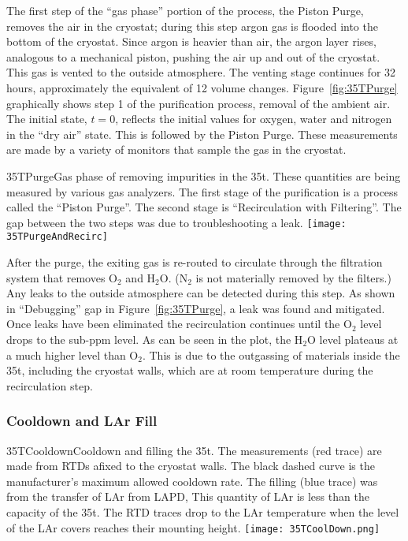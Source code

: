 The first step of the ``gas phase'' portion of the process, the Piston Purge, removes the air in the cryostat; during this step argon gas is flooded into the bottom of the cryostat. Since argon is heavier than air, the argon layer rises, analogous to a mechanical piston, pushing the air up and out of the cryostat. This gas  is vented to the outside atmosphere. The venting stage continues for 32 hours, approximately the equivalent of 12 volume changes. 
%
Figure~\ref{fig:35TPurge} graphically shows step 1 of the purification process, removal of the ambient air. The initial state, $t=0$, reflects the initial values for oxygen, water and nitrogen in the ``dry air'' state. This is followed by the Piston Purge.
These measurements are made by a variety of %
monitors that sample the gas in the cryostat. 

\begin{cdrfigure}{35TPurge}{Gas phase of removing impurities in the 35t. These quantities are being measured by various gas analyzers. The first stage of the purification is a process called the ``Piston Purge''.  The second stage is ``Recirculation with Filtering''. The gap between the two steps was due to troubleshooting a leak.}
  \texttt{[image: 35TPurgeAndRecirc]}
\end{cdrfigure}


After the purge, the exiting gas  is re-routed to circulate through the filtration system that removes O$_2$ and H$_2$O. (N$_2$ is not materially removed by the filters.) Any leaks to the outside atmosphere can be detected during this step. As shown in ``Debugging'' gap in Figure~\ref{fig:35TPurge}, a leak was found and mitigated. Once leaks have been eliminated the recirculation continues until the O$_2$ level drops to the sub-ppm level. As can be seen in the plot, the H$_2$O level plateaus at a much higher level than O$_2$. This is due to the outgassing of materials inside the 35t, including the cryostat walls, which are  at room temperature during  the recirculation step. 

\subsubsection {Cooldown and LAr Fill}

\begin{cdrfigure}{35TCooldown}{Cooldown and filling the 35t. The 
measurements (red trace) are made from RTDs afixed to the cryostat walls. The black dashed curve is the 
manufacturer's maximum allowed cooldown rate. The filling (blue trace) was from the transfer of LAr 
from LAPD, This quantity of LAr is less than the capacity of the 35t. The RTD traces drop to the LAr 
temperature when the level of the LAr covers reaches their mounting height.}
  \texttt{[image: 35TCoolDown.png]}
\end{cdrfigure}

